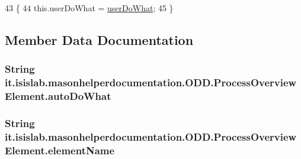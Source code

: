 \begin{DoxyCode}
43                                                  \{
44         this.userDoWhat = \hyperlink{classit_1_1isislab_1_1masonhelperdocumentation_1_1_o_d_d_1_1_process_overview_element_adf547a3ee1fe686d4e7cb2a446761a52}{userDoWhat};
45     \}
\end{DoxyCode}


\subsection{Member Data Documentation}
\hypertarget{classit_1_1isislab_1_1masonhelperdocumentation_1_1_o_d_d_1_1_process_overview_element_a089fb4d866c8dd54cc8deca8f51127e2}{
\subsubsection[{auto\-Do\-What}]{\setlength{\rightskip}{0pt plus 5cm}String it.\-isislab.\-masonhelperdocumentation.\-O\-D\-D.\-Process\-Overview\-Element.\-auto\-Do\-What\hspace{0.3cm}{\ttfamily [private]}}}\label{classit_1_1isislab_1_1masonhelperdocumentation_1_1_o_d_d_1_1_process_overview_element_a089fb4d866c8dd54cc8deca8f51127e2}
\hypertarget{classit_1_1isislab_1_1masonhelperdocumentation_1_1_o_d_d_1_1_process_overview_element_a42984f1c7d0ac6f1c1fe5e8900cee0b9}{
\subsubsection[{element\-Name}]{\setlength{\rightskip}{0pt plus 5cm}String it.\-isislab.\-masonhelperdocumentation.\-O\-D\-D.\-Process\-Overview\-Element.\-element\-Name\hspace{0.3cm}{\ttfamily [private]}}}\label{classit_1_1isislab_1_1masonhelperdocumentation_1_1_o_d_d_1_1_process_overview_element_a42984f1c7d0ac6f1c1fe5e8900cee0b9}
